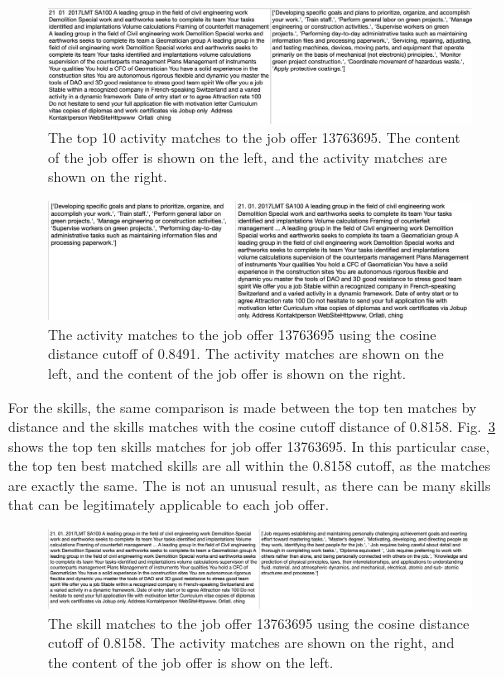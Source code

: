 \begin{figure}[htbp]
  \centering
    \includegraphics[width=1.0\textwidth]{figures/AllActMatches13763695.pdf}
    \caption[The top 10 activity matches to the job offer 13763695]{
    The top 10 activity matches to the job offer 13763695. The content of the job offer is shown on the left, and the activity matches are shown on the right. 
    }
\label{fig:AllActMatches13763695}
\end{figure}

\begin{figure}[htbp]
  \centering
    \includegraphics[width=1.0\textwidth]{figures/GoodActMatches13763695.pdf}
    \caption[The activity matches to the job offer 13763695 using the cosine distance cutoff of 0.8491]{
    The activity matches to the job offer 13763695 using the cosine distance cutoff of 0.8491. The activity matches are shown on the left, and the content of the job offer is shown on the right. 
    }
\label{fig:GoodActMatches13763695}
\end{figure}

For the skills, the same comparison is made between the top ten matches by distance and the skills matches with the cosine cutoff distance of 0.8158. Fig.~\ref{fig:GoodSkillMatches} shows the top ten skills matches for job offer 13763695. In this particular case, the top ten best matched skills are all within the 0.8158 cutoff, as the matches are exactly the same. The is not an unusual result, as there can be many skills that can be legitimately applicable to each job offer. 

\begin{figure}[htbp]
  \centering
    \includegraphics[width=1.0\textwidth]{figures/GoodSkillMatches.pdf}
    \caption[The skill matches to the job offer 13763695 using the cosine distance cutoff of 0.8158]{
    The skill matches to the job offer 13763695 using the cosine distance cutoff of 0.8158. The activity matches are shown on the right, and the content of the job offer is show on the left. 
    }
\label{fig:GoodSkillMatches}
\end{figure}

